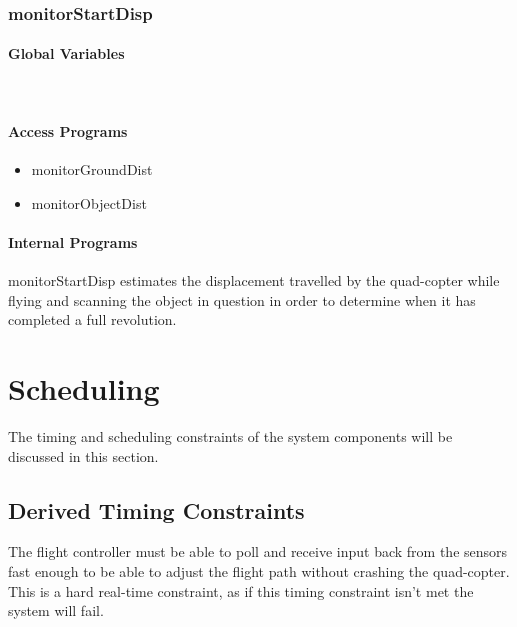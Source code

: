 \documentclass[10pt,letterpaper]{article}
\begin{document}
\subsubsection{monitorStartDisp}
\paragraph{Global Variables}
~
\begin{table}[H]
  \caption{Example subsubmodule}
\end{table}
\paragraph{Access Programs}
\begin{itemize}
\item monitorGroundDist
\item monitorObjectDist
\end{itemize}
\paragraph{Internal Programs}
monitorStartDisp estimates the displacement travelled by the quad-copter while flying and scanning the object in question in order to determine when it has completed a full revolution.


\newpage


\section{Scheduling}
The timing and scheduling constraints of the system components will be discussed in this section. 

\subsection{Derived Timing Constraints}
	The flight controller must be able to poll and receive input back from the sensors fast enough to be able to adjust the flight path without crashing the quad-copter. This is a hard real-time constraint, as if this timing constraint isn't met the system will fail.
    
\end{document}
